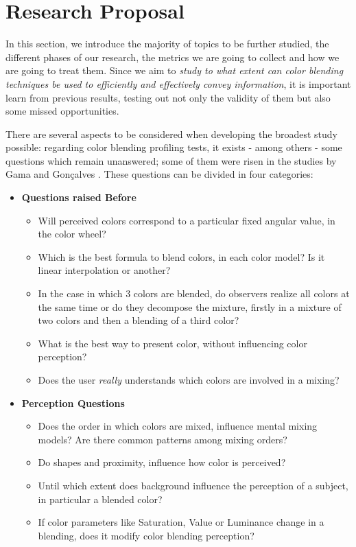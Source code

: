 \documentclass{report}
\begin{document}
\chapter{Research Proposal}

In this section, we introduce the majority of topics to be further studied, the different phases of our research, the metrics we are going to collect
and how we are going to treat them. Since we aim to \emph{study to what extent can color blending techniques be used to efficiently and effectively
convey information}, it is important learn from previous results, testing out not only the validity of them but also some missed opportunities. \par
There are several aspects to be considered when developing the broadest study possible: regarding color blending profiling tests, it exists - among 
others - some questions which remain unanswered; some of them were risen in the studies by Gama and Gonçalves \cite{Gama20141,Gama20142}. These questions can be divided in four categories:
%
\begin{itemize}
	\setlength\itemsep{0.1em}
	\item \textbf{Questions raised Before}
    \begin{itemize}
    	\setlength\itemsep{0.1em}
		\item Will perceived colors correspond to a particular fixed angular value, in the color wheel?	
        \item Which is the best formula to blend colors, in each color model? Is it linear interpolation or another?
        \item In the case in which 3 colors are blended, do observers realize all colors at the same time or do they decompose the mixture, firstly in a mixture of two colors and then a blending of a third color?
        \item What is the best way to present color, without influencing color perception? 
        \item Does the user \emph{really} understands which colors are involved in a mixing? 
	\end{itemize}
    \item \textbf{Perception Questions}
    \begin{itemize}
    	\setlength\itemsep{0.1em}
    	\item Does the order in which colors are mixed, influence mental mixing models? Are there common patterns among mixing orders?
        \item Do shapes and proximity, influence how color is perceived? 
        \item Until which extent does background influence the perception of a subject, in particular a blended color?
        \item If color parameters like Saturation, Value or Luminance change in a blending, does it modify color blending perception?
    \end{itemize}
\end{itemize}
\end{document}
